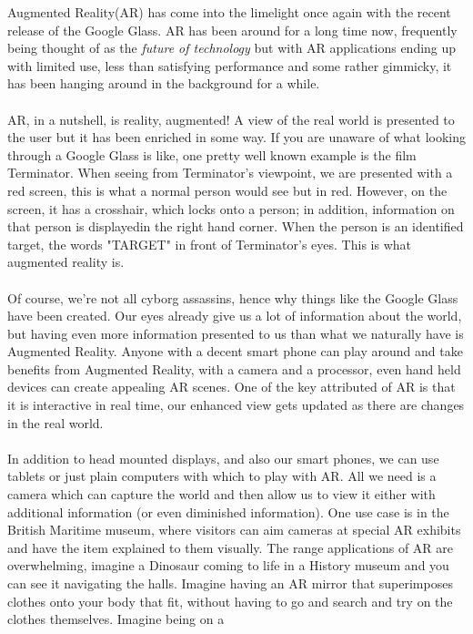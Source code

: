 \documentclass[11pt]{article}
\begin{document}
Augmented Reality(AR) has come into the limelight once
again with the recent release of the Google Glass. AR has 
been around for a long time now, frequently being
thought of as the \textit{future of technology} but with AR applications 
ending up with limited use, less than satisfying performance and some rather
gimmicky, it has been hanging around in the background for a while.
\\ \\
AR, in a nutshell, is reality, augmented! A view of the real world is presented
to the user but it has been enriched in some way. If you are unaware
of what looking through a Google Glass is like, one pretty well known example 
is the film Terminator. When seeing from Terminator's viewpoint, we are 
presented with a red screen, this is what a normal person would see but in red.
However, on the screen, it has a crosshair, which locks onto a person; in 
addition, information on that person is displayedin the right hand corner.
When the person is an identified target, the words "TARGET" in front of 
Terminator's eyes. This is what augmented reality is.\\
\\
Of course, we're not all cyborg assassins, hence why things like the Google 
Glass have been created. Our eyes already give us a lot of information about 
the world, but having even more information presented to us than what we
naturally have is Augmented Reality. Anyone with a decent smart
phone can play around and take benefits from Augmented Reality, 
with a camera and a processor, even hand held devices can create
appealing AR scenes. One of the key attributed of AR is that it
is interactive in real time, our enhanced view gets updated as there are
changes in the real world. \\ 
\\
In addition to head mounted displays, and also our smart phones,
we can use tablets or just plain computers with which to play
with AR. All we need is a camera which can capture the world and then allow 
us to view it either with additional information (or even diminished 
information). One use case is in the British Maritime museum, where 
visitors can aim cameras at special AR exhibits and have the item 
explained to them visually. The range applications of AR are overwhelming,
imagine a Dinosaur coming to life in a
History museum and you can see it navigating the halls. Imagine having an
AR mirror that superimposes clothes onto your body that fit, without having
to go and search and try on the clothes themselves. Imagine being on a 
\end{document}
